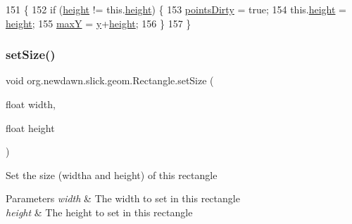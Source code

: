\begin{DoxyCode}
151                                         \{
152         \textcolor{keywordflow}{if} (\mbox{\hyperlink{classorg_1_1newdawn_1_1slick_1_1geom_1_1_rectangle_a3bd010fdce636fc11ed0e0ad4d4b4a0a}{height}} != this.\mbox{\hyperlink{classorg_1_1newdawn_1_1slick_1_1geom_1_1_rectangle_a3bd010fdce636fc11ed0e0ad4d4b4a0a}{height}}) \{
153             \mbox{\hyperlink{classorg_1_1newdawn_1_1slick_1_1geom_1_1_shape_a61fe1954d2fdefc72c34b284f4fcfdb4}{pointsDirty}} = \textcolor{keyword}{true};
154             this.\mbox{\hyperlink{classorg_1_1newdawn_1_1slick_1_1geom_1_1_rectangle_a3bd010fdce636fc11ed0e0ad4d4b4a0a}{height}} = \mbox{\hyperlink{classorg_1_1newdawn_1_1slick_1_1geom_1_1_rectangle_a3bd010fdce636fc11ed0e0ad4d4b4a0a}{height}};
155             \mbox{\hyperlink{classorg_1_1newdawn_1_1slick_1_1geom_1_1_shape_aaacbabfb1b7d0653f59658d92ded1c2b}{maxY}} = \mbox{\hyperlink{classorg_1_1newdawn_1_1slick_1_1geom_1_1_shape_a9f934baded6a1b65ebb69e7e5f80ea00}{y}}+\mbox{\hyperlink{classorg_1_1newdawn_1_1slick_1_1geom_1_1_rectangle_a3bd010fdce636fc11ed0e0ad4d4b4a0a}{height}};
156         \}
157     \}
\end{DoxyCode}
\mbox{\label{classorg_1_1newdawn_1_1slick_1_1geom_1_1_rectangle_a5ca68ddf9ea2e1bf7848c0bc4d140ee2}} 
\subsubsection{\texorpdfstring{set\+Size()}{setSize()}}
{\footnotesize\ttfamily void org.\+newdawn.\+slick.\+geom.\+Rectangle.\+set\+Size (\begin{DoxyParamCaption}\item[{float}]{width,  }\item[{float}]{height }\end{DoxyParamCaption})\hspace{0.3cm}{\ttfamily [inline]}}

Set the size (widtha and height) of this rectangle


\begin{DoxyParams}{Parameters}
{\em width} & The width to set in this rectangle \\
\hline
{\em height} & The height to set in this rectangle \\
\hline
\end{DoxyParams}

